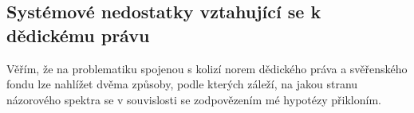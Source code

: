 \documentclass{article}
\begin{document}
\subsection{Systémové nedostatky vztahující se k dědickému právu}




Věřím, že na problematiku spojenou s kolizí norem dědického práva a svěřenského fondu lze nahlížet dvěma způsoby, podle kterých záleží, na jakou stranu názorového spektra se v souvislosti se zodpovězením mé hypotézy přikloním.\\
\end{document}
